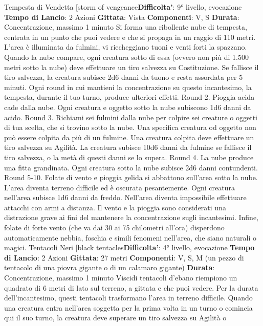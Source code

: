\begin{multicols}{2}
Tempesta di Vendetta
[storm of vengeance\textbf{Difficolta'}:
9° livello, evocazione
\textbf{Tempo di Lancio}: 2 Azioni
\textbf{Gittata}: Vista
\textbf{Componenti}: V, S
\textbf{Durata}: Concentrazione, massimo 1 minuto
Si forma una ribollente nube di tempesta, centrata in un
punto che puoi vedere e che si propaga in un raggio di
110 metri. L’area è illuminata da fulmini, vi riecheggiano
tuoni e venti forti la spazzano. Quando la nube
compare, ogni creatura sotto di essa (ovvero non più di
1.500 metri sotto la nube) deve effettuare un tiro
salvezza su Costituzione. Se fallisce il tiro salvezza, la
creatura subisce 2d6 danni da tuono e resta assordata
per 5 minuti.
Ogni round in cui mantieni la concentrazione su questo
incantesimo, la tempesta, durante il tuo turno, produce
ulteriori effetti.
Round 2. Pioggia acida cade dalla nube. Ogni creatura
e oggetto sotto la nube subiscono 1d6 danni da acido.
Round 3. Richiami sei fulmini dalla nube per colpire sei
creature o oggetti di tua scelta, che si trovino sotto la
nube. Una specifica creatura od oggetto non può
essere colpita da più di un fulmine. Una creatura colpita
deve effettuare un tiro salvezza su Agilità. La
creatura subisce 10d6 danni da fulmine se fallisce il tiro
salvezza, o la metà di questi danni se lo supera.
Round 4. La nube produce una fitta grandinata. Ogni
creatura sotto la nube subisce 2d6 danni contundenti.
Round 5-10. Folate di vento e pioggia gelida si
abbattono sull’area sotto la nube. L’area diventa terreno
difficile ed è oscurata pesantemente. Ogni creatura
nell’area subisce 1d6 danni da freddo. Nell’area diventa
impossibile effettuare attacchi con armi a distanza. Il
vento e la pioggia sono considerati una distrazione
grave ai fini del mantenere la concentrazione sugli
incantesimi. Infine, folate di forte vento (che va dai 30 ai
75 chilometri all’ora) disperdono automaticamente
nebbia, foschia e simili fenomeni nell’area, che siano
naturali o magici.
Tentacoli Neri
[black tentacles\textbf{Difficolta'}:
4° livello, evocazione
\textbf{Tempo di Lancio}: 2 Azioni
\textbf{Gittata}: 27 metri
\textbf{Componenti}: V, S, M (un pezzo di tentacolo di una
piovra gigante o di un calamaro gigante)
\textbf{Durata}: Concentrazione, massimo 1 minuto
Viscidi tentacoli d’ebano riempiono un quadrato di 6
metri di lato sul terreno, a gittata e che puoi vedere. Per
la durata dell’incantesimo, questi tentacoli trasformano
l’area in terreno difficile.
Quando una creatura entra nell’area soggetta per la
prima volta in un turno o comincia qui il suo turno, la
creatura deve superare un tiro salvezza su Agilità o

\end{multicols}
